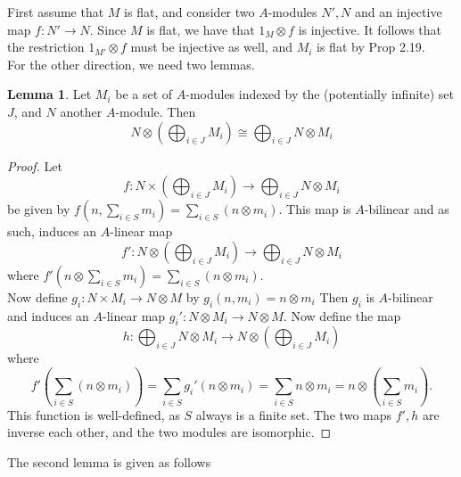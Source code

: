 \documentclass{article}
\theoremstyle{definition}
\newtheorem{lemma}[theorem]{Lemma}
\begin{document}
First assume that $M$ is flat, and consider two $A$-modules $N', N$ and an
injective map $f : N' \to N$. Since $M$ is flat, we have that $1_M \otimes f$
is injective. It follows that the restriction $1_{M'} \otimes f$ must be
injective as well, and $M_i$ is flat by Prop 2.19. \\

For the other direction, we need two lemmas. 

\begin{lemma}
	Let $M_i$ be a set of $A$-modules indexed by the (potentially infinite) 
	set $J$, and $N$ another $A$-module. Then
	\[
		N 
		\otimes 
		\left(
			\bigoplus_{i \in J} M_i
		\right)
		\cong
		\bigoplus_{i \in J} 
		N 
		\otimes 
		M_i
	\] 
\end{lemma}
\begin{proof}
	Let 	
	\[
		f : 
		N 
		\times 
		\left(
			\bigoplus_{i \in J} M_i
		\right)
		\to
		\bigoplus_{i \in J} 
		N 
		\otimes 
		M_i
	\]
	be given by $f\left(n, \sum_{i \in S} m_i\right) = \sum_{i \in S}
	\left(n \otimes m_i\right)$. This map is $A$-bilinear and as such,
	induces an $A$-linear map
	\[
		f' : 
		N 
		\otimes 
		\left(
			\bigoplus_{i \in J} M_i
		\right)
		\to
		\bigoplus_{i \in J} 
		N 
		\otimes 
		M_i
	\]
	where $f'\left(n \otimes \sum_{i \in S} m_i\right) = \sum_{i \in S} \left(n
	\otimes m_i\right)$. \\

	Now define $g_i : N \times M_i \to N \otimes M $ by $g_i(n, m_i) = n
	\otimes m_i$ Then $g_i$ is $A$-bilinear and induces an $A$-linear map $g_i'
	: N \otimes M_i \to N \otimes M$. Now define the map 
	\[
		h :
		\bigoplus_{i \in J} 
		N 
		\otimes 
		M_i
		\to
		N 
		\otimes 
		\left(
			\bigoplus_{i \in J} M_i
		\right)
	\] 
	where
	\[
		f'\left(\sum_{i \in S} \left(n \otimes m_i\right)\right) 
		= 
		\sum_{i \in S} 
		g_i'\left(n \otimes m_i\right)
		= 
		\sum_{i \in S} 
		n \otimes m_i
		= 
		n \otimes
		\left(
		\sum_{i \in S} 
		m_i
		\right).
	\]
	This function is well-defined, as $S$ always is a finite set. The two maps
	$f', h$ are inverse each other, and the two modules are isomorphic.
\end{proof}

The second lemma is given as follows
\end{document}
